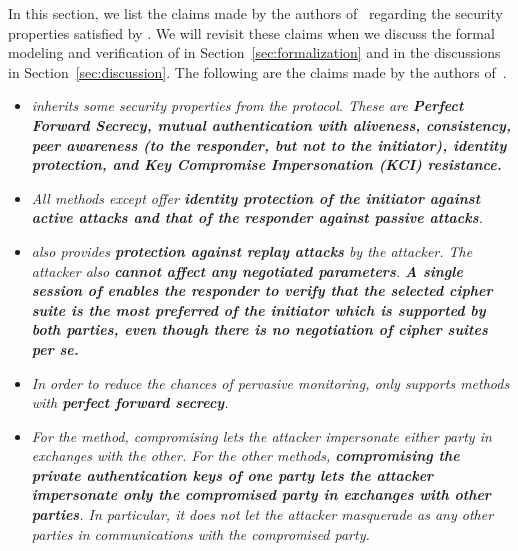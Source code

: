 In this section, we list the claims made by the authors
of~\cite{selander-lake-edhoc-01} regarding the security properties satisfied
by \mEdhoc{}.
%
We will revisit these claims when we discuss the formal modeling and
verification of \mEdhoc{} in Section~\ref{sec:formalization} and in the
discussions in Section~\ref{sec:discussion}. 
%
The following are the claims made by the authors
of~\cite{selander-lake-edhoc-01}. 
\begin{itemize}
    \item \textit{ \mEdhoc{} inherits some security properties from the
        \mSigma{} protocol. These are
        \textbf{Perfect Forward Secrecy,
                mutual authentication
                    with aliveness,
                         consistency,
                         peer awareness (to the responder,
                                         but not to the initiator),
                identity protection, and
                Key Compromise Impersonation (KCI) resistance.
        }}
    \item \textit{All methods except \mPskPsk{} offer
            \textbf{identity protection of the initiator against active attacks
            and that of the responder against passive attacks}.
        }
    \item \textit{\mEdhoc{} also provides
        \textbf{protection against replay attacks} by the attacker.
        The attacker also \textbf{cannot affect any negotiated parameters}.
        \textbf{A single session of \mEdhoc{} enables the responder to verify
            that the selected cipher suite is the most preferred of the
            initiator which is supported by both parties, even though there is
        no negotiation of cipher suites per se.}
        }
    \item \textit{In order to reduce the chances of pervasive monitoring,
            \mEdhoc{} only supports methods with \textbf{perfect forward
            secrecy}.
        }
    \item \textit{For the \mPskPsk{} method, compromising \mPsk{} lets the
            attacker impersonate either party in \mEdhoc{} exchanges with the
            other.
            For the other methods, \textbf{compromising the private
            authentication keys of one party lets the attacker impersonate only
            the compromised party in exchanges with other parties}.
            In particular, it does not let the attacker masquerade as any other
            parties in communications with the compromised party.
        }
\end{itemize}
